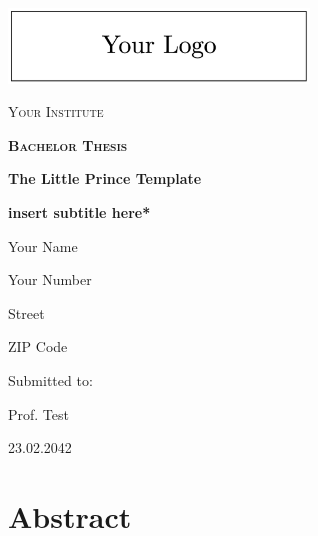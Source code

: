 \documentclass[12pt,titlepage, dvipsnames]{article}
\begin{document}

\begin{titlepage}
  \centering
  \includegraphics[width=8cm]{images/yourlogo.png}\par\vspace{1cm}
  \linespread{1}\Large{\scshape Your Institute\par}
  \vspace{1.5cm}
  {\scshape\Large\bfseries Bachelor Thesis\par}
  {\huge\bfseries The Little Prince Template \par
    \Large\bfseries *insert subtitle here*\par}
  \vspace{1.5cm}
  \linespread{0.75}\Large{Your Name\par Your Number\par Street\par ZIP Code}
  \vfill
  \linespread{0.75}\large{Submitted to:\par
    Prof. Test}
  \vfill
  {\large 23.02.2042\par}
\end{titlepage}


\section*{Abstract}
\lipsum[1] %



\newpage
{}
\renewcommand{\contentsname}{Table of Contents}
\tableofcontents\thispagestyle{fancy}

\newpage
\listoffigures\thispagestyle{fancy}
{}
\end{document}
